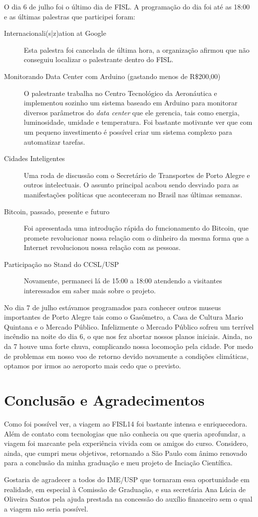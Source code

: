\documentclass{article}
\begin{document}
O dia 6 de julho foi o último dia de FISL. A programação do dia foi até as 18:00 e as últimas palestras que participei foram:

\begin{description}
	\item[Internacionali(s|z)ation at Google] Esta palestra foi cancelada de última hora, a organização afirmou que não conseguiu localizar o palestrante dentro do FISL.
	\item[Monitorando Data Center com Arduino (gastando menos de R\$200,00)] O palestrante trabalha no Centro Tecnológico da Aeronáutica e implementou sozinho um sistema baseado em Arduino para monitorar diversos parâmetros do \emph{data center} que ele gerencia, tais como energia, luminosidade, umidade e temperatura. Foi bastante motivante ver que com um pequeno investimento é possível criar um sistema complexo para automatizar tarefas.
	\item[Cidades Inteligentes] Uma roda de discussão com o Secretário de Transportes de Porto Alegre e outros intelectuais. O assunto principal acabou sendo desviado para as manifestações políticas que aconteceram no Brasil nas últimas semanas.
	\item[Bitcoin, passado, presente e futuro] Foi apresentada uma introdução rápida do funcionamento do Bitcoin, que promete revolucionar nossa relação com o dinheiro da mesma forma que a Internet revolucionou nossa relação com as pessoas.
	\item[Participação no Stand do CCSL/USP] Novamente, permaneci lá de 15:00 a 18:00 atendendo a visitantes interessados em saber mais sobre o projeto.
\end{description}

No dia 7 de julho estávamos programados para conhecer outros museus importantes de Porto Alegre tais como o Gasômetro, a Casa de Cultura Mario Quintana e o Mercado Público. Infelizmente o Mercado Público sofreu um terrível incêndio na noite do dia 6, o que nos fez abortar nossos planos iniciais. Ainda, no da 7 houve uma forte chuva, complicando nossa locomoção pela cidade. Por medo de problemas em nosso voo de retorno devido novamente a condições climáticas, optamos por irmos ao aeroporto mais cedo que o previsto.

\section{Conclusão e Agradecimentos}
Como foi possível ver, a viagem ao FISL14 foi bastante intensa e enriquecedora. Além de contato com tecnologias que não conhecia ou que queria aprofundar, a viagem foi marcante pela experiência vivida com os amigos do curso. Considero, ainda, que cumpri meus objetivos, retornando a São Paulo com ânimo renovado para a conclusão da minha graduação e meu projeto de Inciação Científica. 

Gostaria de agradecer a todos do IME/USP que tornaram essa oportunidade em realidade, em especial à Comissão de Graduação, e sua secretária Ana Lúcia de Oliveira Santos pela ajuda prestada na concessão do auxílio financeiro sem o qual a viagem não seria possível.


%
%
\end{document}
